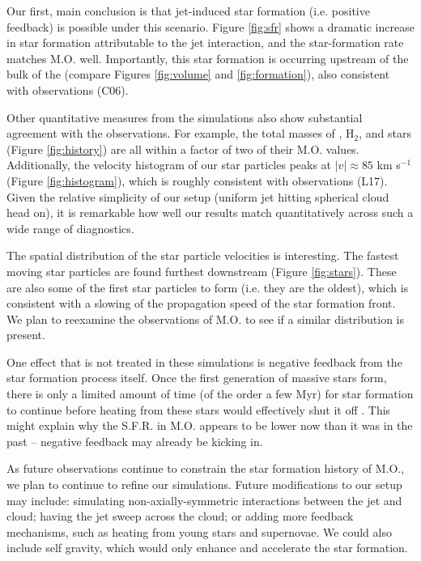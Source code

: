 \documentclass{aastex6}
\begin{document}
Our first, main conclusion is that jet-induced star formation (i.e. positive feedback) is possible under this scenario. Figure \ref{fig:sfr} shows a dramatic increase in star formation attributable to the jet interaction, and the star-formation rate matches M.O. well.  Importantly, this star formation is occurring upstream of the bulk of the  (compare Figures \ref{fig:volume} and \ref{fig:formation}), also consistent with observations (C06). 

Other quantitative measures from the simulations also show substantial agreement with the observations. For example, the total masses of , H$_2$, and stars (Figure \ref{fig:history}) are all within a factor of two of their M.O. values. Additionally, the velocity histogram of our star particles peaks at $| v | \approx 85$ km s$^{-1}$ (Figure \ref{fig:histogram}), which is roughly consistent with observations (L17). Given the relative simplicity of our setup (uniform jet hitting spherical cloud head on), it is remarkable how well our results match quantitatively across such a wide range of diagnostics.

The spatial distribution of the star particle velocities is interesting. The fastest moving star particles are found furthest downstream (Figure \ref{fig:stars}). These are also some of the first star particles to form (i.e. they are the oldest), which is consistent with a slowing of the propagation speed of the star formation front. We plan to reexamine the observations of M.O. to see if a similar distribution is present.

One effect that is not treated in these simulations is negative feedback from the star formation process itself. Once the first generation of massive stars form, there is only a limited amount of time (of the order a few Myr) for star formation to continue before heating from these stars would effectively shut it off \citep{Dong03}. This might explain why the S.F.R. in M.O. appears to be lower now than it was in the past -- negative feedback may already be kicking in.

As future observations continue to constrain the star formation history of M.O., we plan to continue to refine our simulations.  Future modifications to our setup may include: simulating non-axially-symmetric interactions between the jet and cloud; having the jet sweep across the cloud; or adding more feedback mechanisms, such as heating from young stars and supernovae. We could also include self gravity, which would only enhance and accelerate the star formation.
\end{document}
